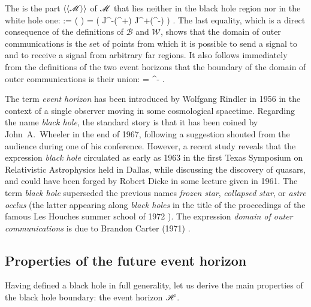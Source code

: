 The 
is the part $\langle\langle \mathscr{M}\rangle\rangle$ of $\mathscr{M}$ that lies neither
in the black hole region nor in the white hole one:
\be
    \langle\langle \M\rangle\rangle := \M\setminus (\cup {} )
            = \left( J^-(\scri^+) \cap J^+(\scri^-) \right) \cap \M .
\ee
The last equality, which is a direct consequence of the definitions of
$\mathscr{B}$ and $\mathscr{W}$, shows that the domain of outer communications
is the set of points from which it is possible to send a signal to and to
receive a signal from arbitrary far regions.
It also follows immediately from the definitions of the two event horizons
that the boundary of the domain of outer communications is their union:
\be
    \partial \langle\langle \M\rangle\rangle  = \Hor \cup \Hor^- .
\ee

\begin{hist}
The term \emph{event horizon} has been introduced by Wolfgang Rindler in 1956 \cite{Rindl56}
in the context of a single observer moving in some cosmological spacetime.
Regarding the name \emph{black hole}, the standard
story is that it has been coined by John~A.~Wheeler in the end of 1967,
following a suggestion shouted from the audience during one of his conference.
However, a recent study \cite{HerdeL18} reveals that the expression \emph{black hole}
circulated as early as 1963 in the first Texas Symposium on Relativistic Astrophysics
held in Dallas,
while discussing the discovery of quasars, and could have been forged by
Robert Dicke in some lecture given in 1961.
The term \emph{black hole} superseded the previous names
\emph{frozen star}, \emph{collapsed star}, or \emph{astre occlus}
(the latter appearing along \emph{black holes} in the title of
the proceedings of the famous Les Houches summer school of 1972 \cite{DeWit73}).
The expression \emph{domain of outer communications} is due to
Brandon Carter
(1971) \cite{Carte71}.
\end{hist}


\subsection{Properties of the future event horizon} \label{s:glo:properties_H}

Having defined a black hole in full generality, let us derive the
main properties of the black hole boundary: the event horizon $\mathscr{H}$.

